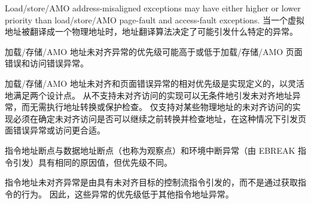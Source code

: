 Load/store/AMO address-misaligned exceptions may have
either higher or lower priority than load/store/AMO page-fault and
access-fault exceptions.
\fi
当一个虚拟地址被翻译成一个物理地址时，地址翻译算法决定了可能引发什么特定的异常。

加载/存储/AMO 地址未对齐异常的优先级可能高于或低于加载/存储/AMO 页面错误和访问错误异常。
\iffalse
\begin{commentary}
The relative priority of load/store/AMO address-misaligned and page-fault
exceptions is implementation-defined to flexibly cater to two design points.
Implementations that never support misaligned accesses can unconditionally
raise the misaligned-address exception without performing address translation
or protection checks.
Implementations that support misaligned accesses only to some physical
addresses must translate and check the address before determining whether the
misaligned access may proceed, in which case raising the page-fault exception
or access is more appropriate.
\end{commentary}
\fi
\begin{commentary}
加载/存储/AMO 地址未对齐和页面错误异常的相对优先级是实现定义的，以灵活地满足两个设计点。 从不支持未对齐访问的实现可以无条件地引发未对齐地址异常，而无需执行地址转换或保护检查。 仅支持对某些物理地址的未对齐访问的实现必须在确定未对齐访问是否可以继续之前转换并检查地址，在这种情况下引发页面错误异常或访问更合适。
\end{commentary}
\iffalse
\begin{commentary}
Instruction address breakpoints have the same cause value as, but
different priority than, data address breakpoints (a.k.a. watchpoints)
and environment break exceptions (which are raised by the EBREAK instruction).
\end{commentary}
\fi
\begin{commentary}
指令地址断点与数据地址断点（也称为观察点）和环境中断异常（由 EBREAK 指令引发）具有相同的原因值，但优先级不同。
\end{commentary}

\iffalse
\begin{commentary}
Instruction address misaligned exceptions are raised by control-flow
instructions with misaligned targets, rather than by the act of fetching an
instruction.  Therefore, these exceptions have lower priority than other
instruction address exceptions.
\end{commentary}
\fi
\begin{commentary}
指令地址未对齐异常是由具有未对齐目标的控制流指令引发的，而不是通过获取指令的行为。 因此，这些异常的优先级低于其他指令地址异常。
\end{commentary}

